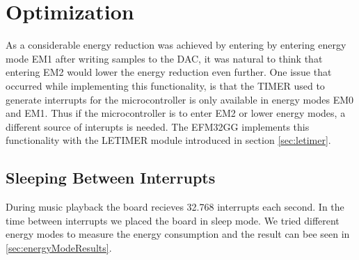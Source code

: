 \section{Optimization}

As a considerable energy reduction was achieved by entering by entering energy mode EM1 after writing samples to the DAC, it was natural to think that entering EM2 would lower the energy reduction even further. One issue that occurred while implementing this functionality, is that the TIMER used to generate interrupts for the microcontroller is only available in energy modes EM0 and EM1. Thus if the microcontroller is to enter EM2 or lower energy modes, a different source of interupts is needed. The EFM32GG implements this functionality with the LETIMER module introduced in section \ref{sec:letimer}.

\subsection{Sleeping Between Interrupts}
During music playback the board recieves 32.768 interrupts each second. In the time between interrupts we placed the board in sleep mode. We tried different energy modes to measure the energy consumption and the result can bee seen in \ref{sec:energyModeResults}.
